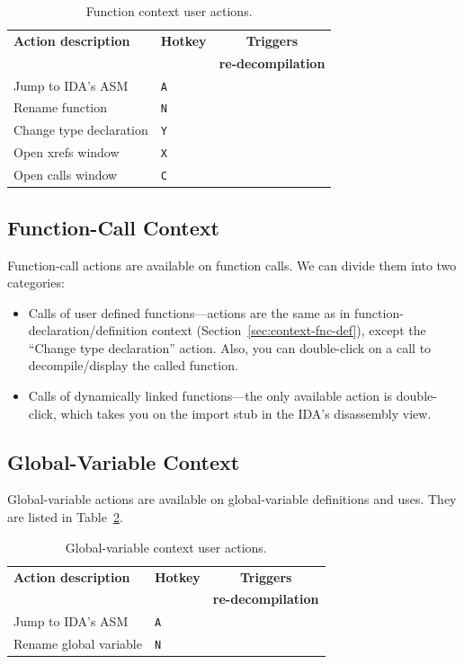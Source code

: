 \documentclass[pdftex, a4paper,12pt, oneside, svgnames]{article}
\newcommand{\cmark}{\ding{51}}%
\newcommand{\xmark}{\ding{55}}%
\begin{document}
\begin{table}[!ht]
\centering
\caption{Function context user actions.}
\label{table:function-context}
\begin{tabular}{llc}
\textbf{Action description} & \textbf{Hotkey} & \textbf{Triggers}\\
& & \textbf{re-decompilation}\\
\hline
Jump to IDA's ASM & \texttt{A} & \xmark \\
Rename function & \texttt{N} & \xmark \\
Change type declaration & \texttt{Y} & \cmark \\
Open xrefs window & \texttt{X} & \xmark \\
Open calls window & \texttt{C} & \xmark \\
\end{tabular}
\end{table}

\subsection{Function-Call Context}
Function-call actions are available on function calls. We can divide them into two categories:
\begin{itemize}
	\item Calls of user defined functions---actions are the same as in function-declaration/definition context (Section~\ref{sec:context-fnc-def}), except the ``Change type declaration'' action. Also, you can double-click on a call to decompile/display the called function.
	\item Calls of dynamically linked functions---the only available action is double-click, which takes you on the import stub in the IDA's disassembly view.
\end{itemize}

\subsection{Global-Variable Context}
Global-variable actions are available on global-variable definitions and uses. They are listed in Table~\ref{table:global-var-context}.

\begin{table}[!ht]
\centering
\caption{Global-variable context user actions.}
\label{table:global-var-context}
\begin{tabular}{llc}
\textbf{Action description} & \textbf{Hotkey} & \textbf{Triggers}\\
& & \textbf{re-decompilation}\\
\hline
Jump to IDA's ASM & \texttt{A} & \xmark \\
Rename global variable & \texttt{N} & \xmark
\end{tabular}
\end{table}
\end{document}
